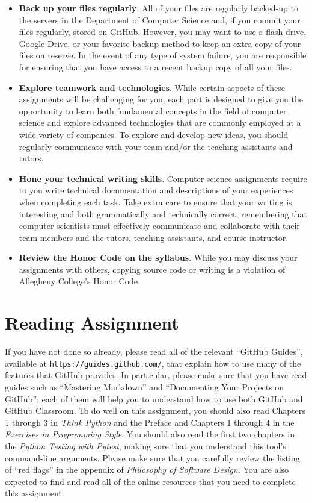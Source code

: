 \documentclass[11pt]{article}
\newcommand{\philosophy}{{\em Philosophy of Software Design\/}}
\newcommand{\pytest}{{\em Python Testing with Pytest\/}}
\newcommand{\url}[1]{\lstinline{#1}}
\begin{document}
\begin{itemize}
\item {\bf Back up your files regularly}. All of your files are regularly
  backed-up to the servers in the Department of Computer Science and, if you
  commit your files regularly, stored on GitHub. However, you may want to use a
  flash drive, Google Drive, or your favorite backup method to keep an extra
  copy of your files on reserve. In the event of any type of system failure,
  you are responsible for ensuring that you have access to a recent backup copy
  of all your files.

\item {\bf Explore teamwork and technologies}. While certain aspects of these
  assignments will be challenging for you, each part is designed to give you the
  opportunity to learn both fundamental concepts in the field of computer
  science and explore advanced technologies that are commonly employed at a wide
  variety of companies. To explore and develop new ideas, you should regularly
  communicate with your team and/or the teaching assistants and tutors.

\item {\bf Hone your technical writing skills}. Computer science assignments
  require to you write technical documentation and descriptions of your
  experiences when completing each task. Take extra care to ensure that your
  writing is interesting and both grammatically and technically correct,
  remembering that computer scientists must effectively communicate and
  collaborate with their team members and the tutors, teaching assistants, and
  course instructor.

\item {\bf Review the Honor Code on the syllabus}. While you may discuss your
  assignments with others, copying source code or writing is a violation of
  Allegheny College's Honor Code.

\end{itemize}

\section*{Reading Assignment}

If you have not done so already, please read all of the relevant ``GitHub
Guides'', available at \url{https://guides.github.com/}, that explain how to use
many of the features that GitHub provides. In particular, please make sure that
you have read guides such as ``Mastering Markdown'' and ``Documenting Your
Projects on GitHub''; each of them will help you to understand how to use both
GitHub and GitHub Classroom. To do well on this assignment, you should also read
Chapters 1 through 3 in {\em Think Python\/} and the Preface and Chapters 1
through 4 in the {\em Exercises in Programming Style\/}.
%
You should also read the first two chapters in the \pytest, making sure that you
understand this tool's command-line arguments.
%
Please make sure that you carefully review the listing of ``red flags'' in the
appendix of \philosophy.
%
You are also expected to find and read all of the online resources that you need
to complete this assignment.
\end{document}
